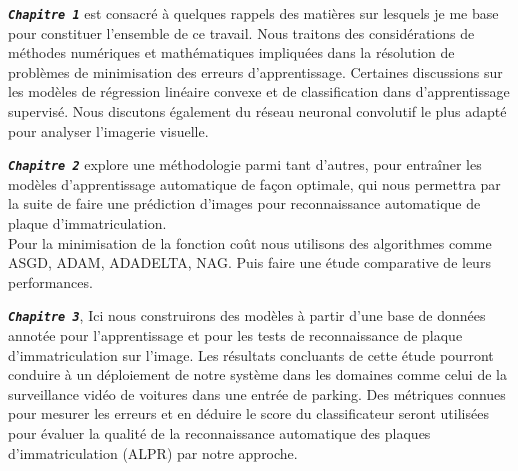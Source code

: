 		\begin{list}{}{En dehors de cette introduction, la partie conclusive et l'annexe, ce mémoire est organisé en quatre chapitres comme suit.}
			\item \textbf{\textsl{\texttt{Chapitre 1}}} est consacré à quelques rappels des matières sur lesquels je me base pour constituer l'ensemble de ce travail.  Nous traitons des considérations de méthodes numériques et mathématiques impliquées dans la résolution de problèmes de minimisation des erreurs d’apprentissage. Certaines discussions sur les modèles de régression linéaire convexe et de classification dans d’apprentissage supervisé. Nous discutons également du réseau neuronal convolutif le plus adapté pour analyser l'imagerie visuelle.
			
			\item \textbf{\textsl{\texttt{Chapitre 2}}}  explore une méthodologie parmi tant d’autres, pour entraîner les modèles d’apprentissage automatique de façon optimale, qui nous permettra par la suite de faire une prédiction d’images pour reconnaissance automatique de plaque d'immatriculation. \\ Pour la minimisation de la fonction coût nous utilisons des algorithmes comme ASGD, ADAM, ADADELTA, NAG. Puis faire une étude comparative de leurs performances.
			
			\item \textbf{\textsl{\texttt{Chapitre 3}}}, Ici nous construirons des modèles à partir d’une base de données annotée pour l'apprentissage et pour les tests de reconnaissance  de plaque d'immatriculation sur l’image. Les résultats concluants de cette étude pourront conduire à un déploiement de notre système dans les domaines comme  celui de la surveillance vidéo de voitures dans une entrée de parking. Des métriques connues pour mesurer les erreurs et en déduire le score du classificateur seront utilisées pour évaluer la qualité de la reconnaissance automatique des plaques d’immatriculation (ALPR) par notre approche.
			
		\end{list}
	
	

		
		
		
		